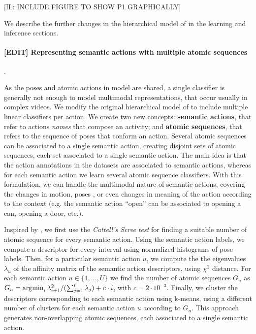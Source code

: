 [IL: INCLUDE  FIGURE TO SHOW P1 GRAPHICALLY]

We describe the further changes in the hierarchical model of \cite{Lillo2014} in the learning and inference sections.
  
\paragraph{[EDIT] Representing semantic actions with multiple atomic sequences}.

As the poses and atomic actions in \cite{Lillo2014} model are shared, a single classifier is generally not enough to model multimodal representations, that occur usually in  complex videos. We modify the original hierarchical model of \cite{Lillo2014} to include multiple linear classifiers per action. We create two new concepts: \textbf{semantic actions}, that refer to actions \emph{names} that compose an activity; and \textbf{atomic sequences}, that refers to the sequence of poses that conform an action. Several atomic sequences can be associated to a single semantic action, creating disjoint sets of atomic sequences, each set associated to a single semantic action.  The main idea is that the action annotations in the datasets are associated to semantic actions, whereas for each semantic action we learn several atomic sequence classifiers. With this formulation, we can handle the multimodal nature of semantic actions, covering the changes in motion, poses , or even changes in meaning of the action according to the context (e.g. the semantic action ``open'' can be associated to opening a can, opening a door, etc.). 

Inspired by \cite{Raptis2012}, we first use the \emph{Cattell's Scree test} for finding a suitable number of atomic sequence for every semantic action. Using the semantic action labels, we compute a descriptor for every interval using normalized histograms of pose labels. Then, for a particular semantic action $u$, we compute the the eigenvalues $\lambda_u$ of the affinity matrix of the semantic action descriptors, using $\chi^2$ distance. For each semantic action $u \in \{1,\dots,U\}$ we find the number of atomic sequences $G_u$ as $G_u = \operatorname*{argmin}_i \lambda_{i+1}^2 / (\sum_{j=1}^i \lambda_j) + c\cdot i$, with $c=2\cdot 10^{-3}$. Finally, we cluster the descriptors corresponding to each semantic action using k-means, using a different number of clusters for each semantic action $u$ according to $G_u$. This approach generates non-overlapping atomic sequences, each associated to a single semantic action.

